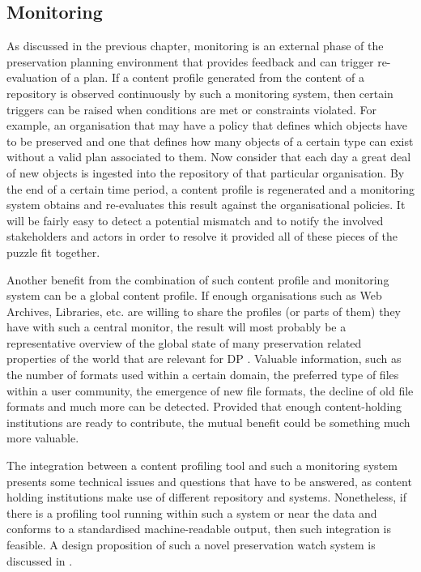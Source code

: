 \subsection{Monitoring}
As discussed in the previous chapter, monitoring is an external phase of the preservation planning environment that provides feedback and can trigger re-evaluation of a plan. If a content profile generated from the content of a repository is observed continuously by such a monitoring system, then certain triggers can be raised when conditions are met or constraints violated.
For example, an organisation that may have a policy that defines which objects have to be preserved and one that defines how many objects of a certain type can exist without a valid plan associated to them. Now consider that each day a great deal of new objects is ingested into the repository of that particular organisation. By the end of a certain time period, a content profile is regenerated and a monitoring system obtains and re-evaluates this result against the organisational policies. It will be fairly easy to detect a potential mismatch and to notify the involved stakeholders and actors in order to resolve it provided all of these pieces of the puzzle fit together.

Another benefit from the combination of such content profile and monitoring system can be a global content profile. If enough organisations such as Web Archives, Libraries, etc. are willing to share the profiles (or parts of them) they have with such a central monitor, the result will most probably be a representative overview of the global state of many preservation related properties of the world that are relevant for DP \cite{becker-ipres2012}. Valuable information, such as the number of formats used within a certain domain, the preferred type of files within a user community, the emergence of new file formats, the decline of old file formats and much more can be detected. Provided that enough content-holding institutions are ready to contribute, the mutual benefit could be something much more valuable.

The integration between a content profiling tool and such a monitoring system presents some technical issues and questions that have to be answered, as content holding institutions make use of different repository and systems. Nonetheless, if there is a profiling tool running within such a system or near the data and conforms to a standardised machine-readable output, then such integration is feasible. A design proposition of such a novel preservation watch system is discussed in \cite{duretec:2012:watch, FariaPDBFR12}.


